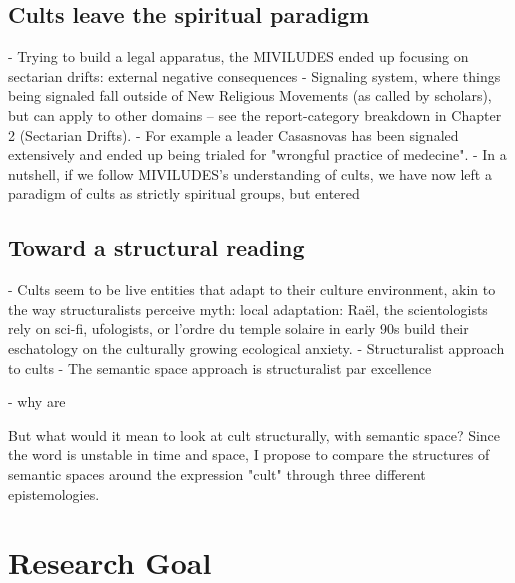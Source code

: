 \subsection{Cults leave the spiritual paradigm}
- Trying to build a legal apparatus, the MIVILUDES ended up focusing on sectarian drifts: external negative consequences
- Signaling system, where things being signaled fall outside of New Religious Movements (as called by scholars), but can apply to other domains -- see the report-category breakdown in Chapter 2 (Sectarian Drifts).
- For example a leader Casasnovas has been signaled extensively and ended up being trialed for "wrongful practice of medecine".
- In a nutshell, if we follow MIVILUDES's understanding of cults, we have now left a paradigm of cults as strictly spiritual groups, but entered

\subsection{Toward a structural reading}
- Cults seem to be live entities that adapt to their culture environment, akin to the way structuralists perceive myth: local adaptation: Raël, the scientologists rely on sci-fi, ufologists, or l'ordre du temple solaire in early 90s build their eschatology\autocite[pp.180]{mayerOurTerrestrialJourney1999} on the culturally growing ecological anxiety.
- Structuralist approach to cults
- The semantic space approach is structuralist par excellence

- why are

But what would it mean to look at cult structurally, with semantic space? Since the word is unstable in time and space, I propose to compare the structures of semantic spaces around the expression "cult" through three different epistemologies.


\section{Research Goal}

